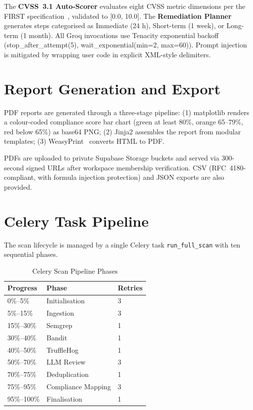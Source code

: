 \documentclass[conference]{IEEEtran}
\begin{document}
The \textbf{CVSS~3.1 Auto-Scorer} evaluates eight CVSS metric dimensions
per the FIRST specification~\cite{CVSS31}, validated to [0.0, 10.0].
The \textbf{Remediation Planner} generates steps categorised as
Immediate (24 h), Short-term (1 week), or Long-term (1 month).
All Groq invocations use Tenacity exponential backoff
(stop\_after\_attempt(5), wait\_exponential(min=2, max=60)).
Prompt injection is mitigated by wrapping user code in explicit XML-style
delimiters.

\section{Report Generation and Export}
\label{sec:report}

PDF reports are generated through a three-stage pipeline:
(1) matplotlib renders a colour-coded compliance score bar chart
(green at least 80\%, orange 65--79\%, red below 65\%) as base64 PNG;
(2) Jinja2 assembles the report from modular templates;
(3) WeasyPrint~\cite{weasyprint} converts HTML to PDF.

PDFs are uploaded to private Supabase Storage buckets and served via
300-second signed URLs after workspace membership verification. CSV
(RFC~4180-compliant, with formula injection protection) and JSON exports
are also provided.

\section{Celery Task Pipeline}
\label{sec:task}

The scan lifecycle is managed by a single Celery task
\texttt{run\_full\_scan} with ten sequential phases.

\begin{table}[htbp]
\centering
\caption{Celery Scan Pipeline Phases}
\label{tab:celery}
\scriptsize
\begin{tabular}{@{}lll@{}}
\toprule
\textbf{Progress} & \textbf{Phase} & \textbf{Retries} \\
\midrule
0\%--5\%    & Initialisation     & 3 \\
5\%--15\%   & Ingestion          & 3 \\
15\%--30\%  & Semgrep            & 1 \\
30\%--40\%  & Bandit             & 1 \\
40\%--50\%  & TruffleHog         & 1 \\
50\%--70\%  & LLM Review         & 3 \\
70\%--75\%  & Deduplication      & 1 \\
75\%--95\%  & Compliance Mapping & 3 \\
95\%--100\% & Finalisation       & 1 \\
\bottomrule
\end{tabular}
\end{table}
\end{document}
